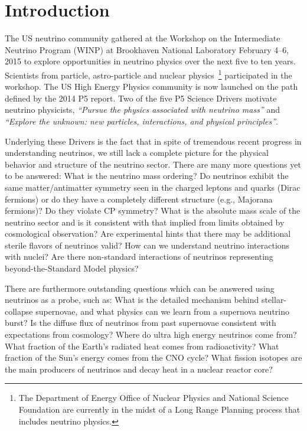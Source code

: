 \section{Introduction}
\label{sec:Introduction}


The US neutrino community gathered at the Workshop on the Intermediate
Neutrino Program (WINP) at Brookhaven National Laboratory February
4--6, 2015 to explore opportunities in neutrino physics over the next
five to ten years. Scientists from particle, astro-particle and
nuclear physics~\footnote{The Department of Energy Office of Nuclear
  Physics and National Science Foundation are currently in the midst
  of a Long Range Planning process that includes neutrino physics.}
participated in the workshop. The US High Energy Physics community is
now launched on the path defined by the 2014 P5 report.  Two of the
five P5 Science Drivers motivate neutrino physicists, \textit{``Pursue
  the physics associated with neutrino mass''} and \textit{``Explore
  the unknown: new particles, interactions, and physical
  principles''}.

Underlying these Drivers is the fact that in spite of tremendous
recent progress in understanding neutrinos, we still lack a complete
picture for the physical behavior and structure of the
neutrino sector. There are many more questions yet to be answered:
What is the neutrino mass ordering? Do neutrinos exhibit the same
matter/antimatter symmetry seen in the charged leptons and quarks
(Dirac fermions) or do they have a completely different structure
(e.g., Majorana fermions)?  Do they violate CP symmetry?  What is the
absolute mass scale of the neutrino sector and is it consistent with
that implied from limits obtained by cosmological observation? Are
experimental hints that there may be additional sterile flavors of
neutrinos valid?  How can we understand neutrino interactions with
nuclei?  Are there non-standard interactions of neutrinos representing
beyond-the-Standard Model physics? 

There are furthermore outstanding questions which can be answered
using neutrinos as a probe, such as: What is the detailed mechanism
behind stellar-collapse supernovae, and what physics can we learn from
a supernova neutrino burst? Is the diffuse flux of neutrinos from past
supernovae consistent with expectations from cosmology?  Where do
ultra high energy neutrinos come from?  What fraction of the Earth's
radiated heat comes from radioactivity?  What fraction of the Sun's
energy comes from the CNO cycle?  What fission isotopes are the main
producers of neutrinos and decay heat in a nuclear reactor core?

